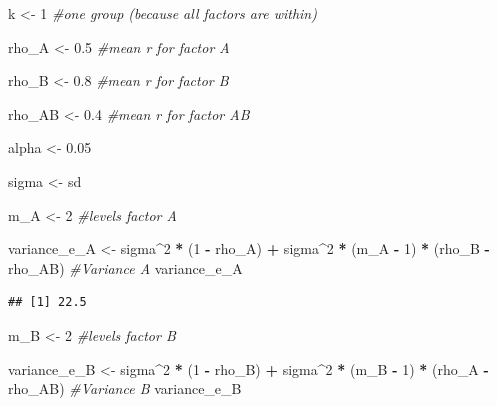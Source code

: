 \documentclass[]{book}
\newenvironment{Shaded}{\begin{snugshade}}{\end{snugshade}}
\newcommand{\CommentTok}[1]{\textcolor[rgb]{0.56,0.35,0.01}{\textit{#1}}}
\newcommand{\DecValTok}[1]{\textcolor[rgb]{0.00,0.00,0.81}{#1}}
\newcommand{\FloatTok}[1]{\textcolor[rgb]{0.00,0.00,0.81}{#1}}
\newcommand{\NormalTok}[1]{#1}
\newcommand{\OperatorTok}[1]{\textcolor[rgb]{0.81,0.36,0.00}{\textbf{#1}}}
\newcommand{\StringTok}[1]{\textcolor[rgb]{0.31,0.60,0.02}{#1}}
\begin{document}
\begin{Shaded}
\begin{Highlighting}[]
\NormalTok{k <-}\StringTok{ }\DecValTok{1} \CommentTok{#one group (because all factors are within)}

\NormalTok{rho_A <-}\StringTok{ }\FloatTok{0.5} \CommentTok{#mean r for factor A}

\NormalTok{rho_B <-}\StringTok{ }\FloatTok{0.8} \CommentTok{#mean r for factor B}

\NormalTok{rho_AB <-}\StringTok{ }\FloatTok{0.4} \CommentTok{#mean r for factor AB}

\NormalTok{alpha <-}\StringTok{ }\FloatTok{0.05}

\NormalTok{sigma <-}\StringTok{ }\NormalTok{sd}

\NormalTok{m_A <-}\StringTok{ }\DecValTok{2} \CommentTok{#levels factor A}

\NormalTok{variance_e_A <-}\StringTok{ }\NormalTok{sigma}\OperatorTok{^}\DecValTok{2} \OperatorTok{*}\StringTok{ }\NormalTok{(}\DecValTok{1} \OperatorTok{-}\StringTok{ }\NormalTok{rho_A) }\OperatorTok{+}\StringTok{ }
\StringTok{  }\NormalTok{sigma}\OperatorTok{^}\DecValTok{2} \OperatorTok{*}\StringTok{ }\NormalTok{(m_A }\OperatorTok{-}\StringTok{ }\DecValTok{1}\NormalTok{) }\OperatorTok{*}\StringTok{ }\NormalTok{(rho_B }\OperatorTok{-}\StringTok{ }\NormalTok{rho_AB) }
\CommentTok{#Variance A}
\NormalTok{variance_e_A}
\end{Highlighting}
\end{Shaded}

\begin{verbatim}
## [1] 22.5
\end{verbatim}

\begin{Shaded}
\begin{Highlighting}[]
\NormalTok{m_B <-}\StringTok{ }\DecValTok{2} \CommentTok{#levels factor B}

\NormalTok{variance_e_B <-}\StringTok{ }\NormalTok{sigma}\OperatorTok{^}\DecValTok{2} \OperatorTok{*}\StringTok{ }\NormalTok{(}\DecValTok{1} \OperatorTok{-}\StringTok{ }\NormalTok{rho_B) }\OperatorTok{+}\StringTok{ }
\StringTok{  }\NormalTok{sigma}\OperatorTok{^}\DecValTok{2} \OperatorTok{*}\StringTok{ }\NormalTok{(m_B }\OperatorTok{-}\StringTok{ }\DecValTok{1}\NormalTok{) }\OperatorTok{*}\StringTok{ }\NormalTok{(rho_A }\OperatorTok{-}\StringTok{ }\NormalTok{rho_AB)}
\CommentTok{#Variance B}
\NormalTok{variance_e_B}
\end{Highlighting}
\end{Shaded}
\end{document}
